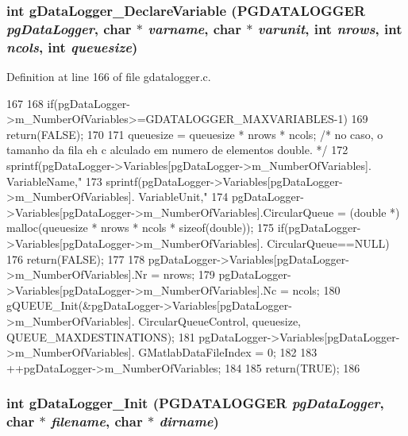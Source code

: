 \subsubsection[{gDataLogger\_\-DeclareVariable}]{\setlength{\rightskip}{0pt plus 5cm}int gDataLogger\_\-DeclareVariable ({\bf PGDATALOGGER} {\em pgDataLogger}, \/  char $\ast$ {\em varname}, \/  char $\ast$ {\em varunit}, \/  int {\em nrows}, \/  int {\em ncols}, \/  int {\em queuesize})}\label{gdatalogger_8c_a3f8f2b3c3f5edc72c3a1887965a544c1}


Definition at line 166 of file gdatalogger.c.


\begin{DoxyCode}
167 {
168         if(pgDataLogger->m_NumberOfVariables>=GDATALOGGER_MAXVARIABLES-1){
169                 return(FALSE);
170         }
171         queuesize = queuesize * nrows * ncols; /* no caso, o tamanho da fila eh c
      alculado em numero de elementos double. */
172         sprintf(pgDataLogger->Variables[pgDataLogger->m_NumberOfVariables].
      VariableName,"%
173         sprintf(pgDataLogger->Variables[pgDataLogger->m_NumberOfVariables].
      VariableUnit,"%
174         pgDataLogger->Variables[pgDataLogger->m_NumberOfVariables].CircularQueue 
      = (double *) malloc(queuesize * nrows * ncols * sizeof(double));
175         if(pgDataLogger->Variables[pgDataLogger->m_NumberOfVariables].
      CircularQueue==NULL){
176                 return(FALSE);
177         }
178         pgDataLogger->Variables[pgDataLogger->m_NumberOfVariables].Nr = nrows;
179         pgDataLogger->Variables[pgDataLogger->m_NumberOfVariables].Nc = ncols;
180         gQUEUE_Init(&pgDataLogger->Variables[pgDataLogger->m_NumberOfVariables].
      CircularQueueControl, queuesize, QUEUE_MAXDESTINATIONS);
181         pgDataLogger->Variables[pgDataLogger->m_NumberOfVariables].
      GMatlabDataFileIndex = 0;
182         
183         ++pgDataLogger->m_NumberOfVariables;
184 
185         return(TRUE);
186 }
\end{DoxyCode}
\subsubsection[{gDataLogger\_\-Init}]{\setlength{\rightskip}{0pt plus 5cm}int gDataLogger\_\-Init ({\bf PGDATALOGGER} {\em pgDataLogger}, \/  char $\ast$ {\em filename}, \/  char $\ast$ {\em dirname})}\label{gdatalogger_8c_ab5eeb22d60836d57bae0dde821337045}


